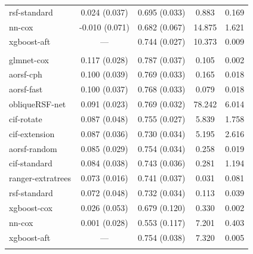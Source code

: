 \documentclass[12pt]{article}\usepackage[]{graphicx}\usepackage[]{xcolor}
\newenvironment{knitrout}{}{} %
\begin{document}
\begin{knitrout}
\begin{longtable}[t]{lcccc}
\hspace{1em}rsf-standard & 0.024 (0.037) & 0.695 (0.033) & 0.883 & 0.169\\
\hspace{1em}nn-cox & -0.010 (0.071) & 0.682 (0.067) & 14.875 & 1.621\\
\hspace{1em}xgboost-aft & --- & 0.744 (0.027) & 10.373 & 0.009\\
\addlinespace[0.3em]
\multicolumn{5}{l}{\textit{\textbf{FCL; death, n = 541, p = 7}}}\\
\hline
\hspace{1em}glmnet-cox & 0.117 (0.028) & 0.787 (0.037) & 0.105 & 0.002\\
\hspace{1em}aorsf-cph & 0.100 (0.039) & 0.769 (0.033) & 0.165 & 0.018\\
\hspace{1em}aorsf-fast & 0.100 (0.037) & 0.768 (0.033) & 0.079 & 0.018\\
\hspace{1em}obliqueRSF-net & 0.091 (0.023) & 0.769 (0.032) & 78.242 & 6.014\\
\hspace{1em}cif-rotate & 0.087 (0.048) & 0.755 (0.027) & 5.839 & 1.758\\
\hspace{1em}cif-extension & 0.087 (0.036) & 0.730 (0.034) & 5.195 & 2.616\\
\hspace{1em}aorsf-random & 0.085 (0.029) & 0.754 (0.034) & 0.258 & 0.019\\
\hspace{1em}cif-standard & 0.084 (0.038) & 0.743 (0.036) & 0.281 & 1.194\\
\hspace{1em}ranger-extratrees & 0.073 (0.016) & 0.741 (0.037) & 0.031 & 0.081\\
\hspace{1em}rsf-standard & 0.072 (0.048) & 0.732 (0.034) & 0.113 & 0.039\\
\hspace{1em}xgboost-cox & 0.026 (0.053) & 0.679 (0.120) & 0.330 & 0.002\\
\hspace{1em}nn-cox & 0.001 (0.028) & 0.553 (0.117) & 7.201 & 0.403\\
\hspace{1em}xgboost-aft & --- & 0.754 (0.038) & 7.320 & 0.005\\
\addlinespace[0.3em]

\end{longtable}
\end{knitrout}
\end{document}
